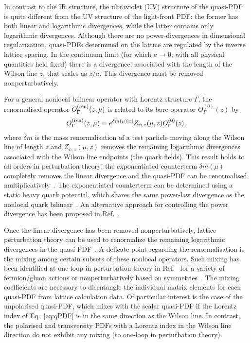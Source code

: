 \begin{itemize}
In contrast to the IR structure, the ultraviolet (UV) structure of the quasi-PDF is quite different from the UV structure of the light-front PDF: the former has both linear and logarithmic divergences, while the latter contains only logarithmic divergences. Although there are no power-divergences in dimensional regularization, quasi-PDFs determined on the lattice are regulated by the inverse lattice spacing. In the continuum limit (for which $a\to 0$, with all physical quantities held fixed) there is a divergence, associated with the length of the Wilson line $z$, that scales as $z/a$. This divergence must be removed nonperturbatively.

For a general nonlocal bilinear operator with Lorentz structure $\Gamma$, 
the renormalised operator $O_{\Gamma}^{\rm (ren)}(z,\mu)$ is related to its bare 
operator $O^{(0)}_{\Gamma}(z)$ by~\cite{Dotsenko:1979wb,Arefeva:1980zd, 
Craigie:1980qs,Stefanis:1983ke,Dorn:1986dt}
\begin{equation}\label{eq:renorm_non-local}
O_{\Gamma}^{\rm (ren)}(z,\mu)=e^{\delta m(\mu)|z|}Z_{\psi, z}(\mu,z)O^{(0)}_{\Gamma}(z),
\end{equation}
where $\delta m$ is the mass renormalisation of a test particle moving along the Wilson line of length $z$ and $Z_{\psi, z}(\mu,z)$ removes the remaining logarithmic divergences associated with the Wilson line endpoints (the quark fields). This result holds to all orders in perturbation theory: the exponentiated counterterm $\delta m(\mu)$ completely removes the linear divergence and the quasi-PDF can be renormalised multiplicatively~\cite{Ji:2017oey,Ishikawa:2017faj}. The exponentiated counterterm can be determined using a static heavy quark potential, which shares the same power-law divergence as the nonlocal quark bilinear~\cite{Musch:2010ka,Ishikawa:2016znu,Chen:2016fxx,Green:2017xeu}. An alternative approach for controlling the power divergence has been proposed in Ref.~\cite{Monahan:2016bvm}.

Once the linear divergence has been removed nonperturbatively, lattice perturbation theory can be used to renormalize the remaining logarithmic divergences in the quasi-PDF~\cite{Ishikawa:2016znu,Chen:2016fxx,Carlson:2017gpk,Xiong:2017jtn}. A delicate point regarding the renormalisation is the mixing among certain subsets of these nonlocal operators. Such mixing has been identified at one-loop in perturbation theory in Ref.~\cite{Constantinou:2017sej} 
for a variety of fermion/gluon actions or nonperturbatively based on 
symmetries~\cite{Chen:2017mzz,Chen:2017mie}. The mixing coefficients are necessary to disentangle the individual matrix elements for each quasi-PDF from lattice calculation data. Of particular interest is the case of the unpolarised quasi-PDF, which mixes with the scalar quasi-PDF if the Lorentz index of Eq.~\eqref{eq:qPDF} is in the same direction as the Wilson line. In contrast, the polarised and transversity PDFs with a Lorentz index in the Wilson line direction do not exhibit any mixing (to one-loop in perturbation theory). 


\end{itemize}
